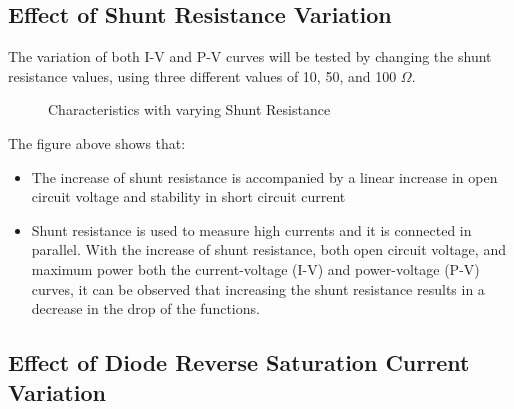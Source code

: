 \documentclass{report}
\begin{document}
\subsection{Effect of Shunt Resistance Variation}
The variation of both I-V and P-V curves will be tested by changing the shunt resistance values, using three different values of 10, 50, and 100 $\Omega$.

\begin{figure}[h!]
  \centering
  \hfill
  \caption{Characteristics with varying Shunt Resistance}
\end{figure}

\hfill \break
The figure above shows that:
\begin{itemize}
    \item The increase of shunt resistance is accompanied by a linear increase in open circuit voltage and stability in short circuit current
    \item  Shunt resistance is used to measure high currents and it is connected in parallel. With the increase of shunt resistance, both open circuit voltage, and maximum power
    \itemIn both the current-voltage (I-V) and power-voltage (P-V) curves, it can be observed that increasing the shunt resistance results in a decrease in the drop of the functions.
\end{itemize}

\subsection{Effect of Diode Reverse Saturation Current Variation}
\end{document}
